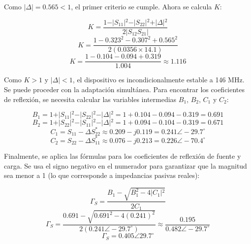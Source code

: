 \documentclass[11pt,a4paper,twoside]{report}
\begin{document}
	Como $\vert{}\Delta\vert{} = 0.565 < 1$, el primer criterio se cumple. Ahora se calcula $K$:
	
	\begin{equation}
		K = \frac{1 - \vert{}S_{11}\vert{}^2 - \vert{}S_{22}\vert{}^2 + \vert{}\Delta\vert{}^2}{2 \vert{}S_{12} S_{21}\vert{}}
	\end{equation}
	\begin{equation}
		K = \frac{1 - 0.323^2 - 0.307^2 + 0.565^2}{2 (0.0356 \times 14.1)}
	\end{equation}
	\begin{equation}
		K = \frac{1 - 0.104 - 0.094 + 0.319}{1.004} \approx 1.116
	\end{equation}
	
	Como $K > 1$ y $\vert{}\Delta\vert{} < 1$, el dispositivo es incondicionalmente estable a 146 MHz. Se puede proceder con la adaptación simultánea. Para encontrar los coeficientes de reflexión, se necesita calcular las variables intermedias $B_1$, $B_2$, $C_1$ y $C_2$:
	
	\begin{equation}
		B_1 = 1 + \vert{}S_{11}\vert{}^2 - \vert{}S_{22}\vert{}^2 - \vert{}\Delta\vert{}^2 = 1 + 0.104 - 0.094 - 0.319 = 0.691
	\end{equation}
	\begin{equation}
		B_2 = 1 + \vert{}S_{22}\vert{}^2 - \vert{}S_{11}\vert{}^2 - \vert{}\Delta\vert{}^2 = 1 + 0.094 - 0.104 - 0.319 = 0.671
	\end{equation}
	\begin{equation}
		C_1 = S_{11} - \Delta S_{22}^* \approx 0.209 - j0.119 = 0.241 \angle -29.7^\circ
	\end{equation}
	\begin{equation}
		C_2 = S_{22} - \Delta S_{11}^* \approx 0.076 - j0.213 = 0.226 \angle -70.4^\circ
	\end{equation}
	
	Finalmente, se aplica las fórmulas para los coeficientes de reflexión de fuente y carga. Se usa el signo negativo en el numerador para garantizar que la magnitud sea menor a 1 (lo que corresponde a impedancias pasivas reales):
	
	\begin{equation}
		\Gamma_S = \frac{B_1 - \sqrt{B_1^2 - 4\vert{}C_1\vert{}^2}}{2C_1}
	\end{equation}
	\begin{equation}
		\Gamma_S = \frac{0.691 - \sqrt{0.691^2 - 4(0.241)^2}}{2(0.241 \angle -29.7^\circ)} \approx \frac{0.195}{0.482 \angle -29.7^\circ}
	\end{equation}
	\begin{equation}
		\Gamma_S = 0.405 \angle 29.7^\circ
	\end{equation}
	
\end{document}
